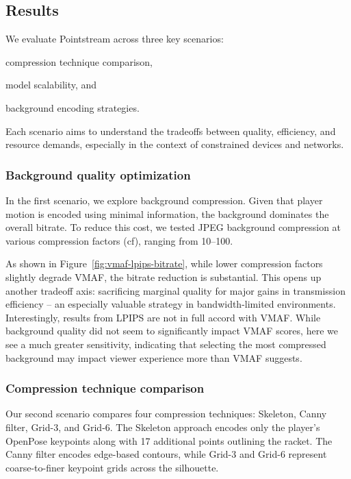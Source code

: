 \documentclass[manuscript, screen]{acmart}
\begin{document}
\subsection{Results}
We evaluate Pointstream across three key scenarios:
\begin{enumerate*}[label=\textit{(\roman*)}]
    \item compression technique comparison,
    \item model scalability, and
    \item background encoding strategies.
\end{enumerate*}
Each scenario aims to understand the tradeoffs between quality, efficiency, and resource demands, especially in the context of constrained devices and networks.



\subsubsection*{Background quality optimization}
In the first scenario, we explore background compression. Given that player motion is encoded using minimal information, the background dominates the overall bitrate. To reduce this cost, we tested JPEG background compression at various compression factors (cf), ranging from \numrange{10}{100}.

As shown in Figure~\ref{fig:vmaf-lpips-bitrate}, while lower compression factors slightly degrade VMAF, the bitrate reduction is substantial. This opens up another tradeoff axis: sacrificing marginal quality for major gains in transmission efficiency -- an especially valuable strategy in bandwidth-limited environments.
Interestingly, results from LPIPS are not in full accord with VMAF. While background quality did not seem to significantly impact VMAF scores, here we see a much greater sensitivity, indicating that selecting the most compressed background may impact viewer experience more than VMAF suggests.

\subsubsection*{Compression technique comparison}
Our second scenario compares four compression techniques: Skeleton, Canny filter, Grid-3, and Grid-6. 
The Skeleton approach encodes only the player’s OpenPose keypoints along with \num{17} additional points outlining the racket. 
The Canny filter encodes edge-based contours, while Grid-3 and Grid-6 represent coarse-to-finer keypoint grids across the silhouette.
\end{document}
